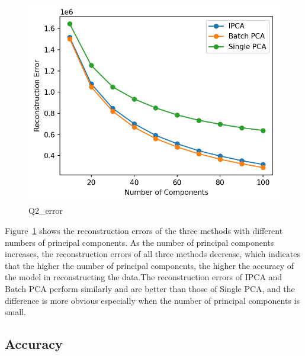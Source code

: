 \begin{figure}[h]
	\centering
	\includegraphics[width=0.8\linewidth]{Ressources/Q2_error.png}
	
	\caption{Q2\_error}
	\label{fig:Q2_error}
\end{figure}
Figure~\ref{fig:Q2_error} shows the reconstruction errors of the three methods with different numbers of principal components. As the number of principal components increases, the reconstruction errors of all three methods decrease, which indicates that the higher the number of principal components, the higher the accuracy of the model in reconstructing the data.The reconstruction errors of IPCA and Batch PCA perform similarly and are better than those of Single PCA, and the difference is more obvious especially when the number of principal components is small.

\subsection{Accuracy}

